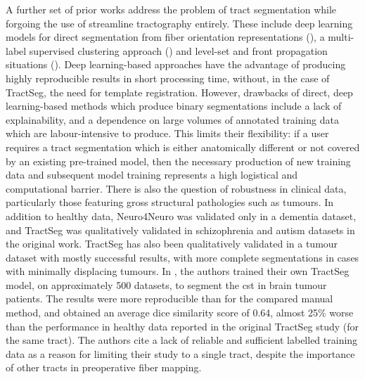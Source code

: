 A further set of prior works address the problem of tract segmentation while forgoing the use of streamline tractography entirely.
These include deep learning models for direct segmentation from fiber orientation representations (\textcite{Li2020, Wasserthal2018}), a multi-label supervised clustering approach (\textcite{Ratnarajah2014}) and level-set and front propagation situations (\textcite{Nazem-Zadeh2011, Hao2014}).
Deep learning-based approaches have the advantage of producing highly reproducible results in short processing time, without, in the case of TractSeg, the need for template registration.
However, drawbacks of direct, deep learning-based methods which produce binary segmentations include a lack of explainability, and a dependence on large volumes of annotated training data which are labour-intensive to produce.
This limits their flexibility: if a user requires a tract segmentation which is either anatomically different or not covered by an existing pre-trained model, then the necessary production of new training data and subsequent model training represents a high logistical and computational barrier.
There is also the question of robustness in clinical data, particularly those featuring gross structural pathologies such as tumours.
In addition to healthy data, Neuro4Neuro\textcite{Li2020} was validated only in a dementia dataset, and TractSeg\autocite{Wasserthal2018} was qualitatively validated in schizophrenia and autism datasets in the original work.
TractSeg has also been qualitatively validated in a tumour dataset with mostly successful results, with more complete segmentations in cases with minimally displacing tumours.\autocite{Richards2021}
In \textcite{Moshe2022}, the authors trained their own TractSeg model, on approximately 500 datasets, to segment the \gls{cst} in brain tumour patients.
The results were more reproducible than for the compared manual method, and obtained an average dice similarity score of 0.64, almost 25\% worse than the performance in healthy data reported in the original TractSeg study (for the same tract).
The authors cite a lack of reliable and sufficient labelled training data as a reason for limiting their study to a single tract, despite the importance of other tracts in preoperative fiber mapping.

